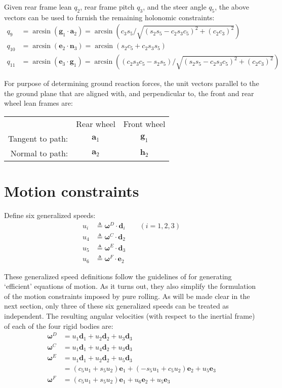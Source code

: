 \documentclass[letterpaper,11pt]{article}
\newcommand{\bs}[1]{ \boldsymbol{ #1 } }
\begin{document}
Given rear frame lean $q_2$, rear frame pitch $q_3$, and the steer angle
$q_5$, the above vectors can be used to furnish the remaining holonomic
constraints:
\begin{align*}
  q_9 & = \arcsin(\bs{g}_1 \cdot \bs{a}_2) = \arcsin\left(c_3 s_5 / \sqrt{(s_2 s_5 -
  c_2 s_3 c_5)^2 + (c_2 c_3)^2}\right) \\
  q_{10} & = \arcsin(\bs{e}_2 \cdot \bs{n}_3) = \arcsin\left(s_2 c_5 + c_2 s_3
  s_5\right)
  \\
  q_{11} & = \arcsin(\bs{e}_3 \cdot \bs{g}_1) = \arcsin \left( (c_2 s_3 c_5 - s_2
    s_5) /\sqrt{(s_2 s_5 - c_2 s_3 c_5)^2 + (c_2 c_3)^2}\right)
\end{align*}

For purpose of determining ground reaction forces, the unit vectors parallel to
the the ground plane that are aligned with, and perpendicular to, the front and
rear wheel lean frames are:
\begin{tabular}{rcc}
  & Rear wheel & Front wheel \\
  Tangent to path: & $\bs{a}_1$ & $\bs{g}_1$\\
  Normal to path: & $\bs{a}_2$ & $\bs{h}_2$
\end{tabular}

\section*{Motion constraints}
Define six generalized speeds:
\begin{align*}
  u_i & \triangleq \bs{\omega}^D \cdot \bs{d}_i \qquad (i = 1, 2, 3)\\
  u_4 & \triangleq \bs{\omega}^C \cdot \bs{d}_2\\
  u_5 & \triangleq \bs{\omega}^E \cdot \bs{d}_3\\
  u_6 & \triangleq \bs{\omega}^F \cdot \bs{e}_2
\end{align*}

These generalized speed definitions follow the guidelines of \cite{Mitiguy1996}
for generating `efficient' equations of motion.  As it turns out, they also
simplify the formulation of the motion constraints imposed by pure rolling.  As
will be made clear in the next section, only three of these six generalized
speeds can be treated as independent.  The resulting angular velocities (with
respect to the inertial frame) of each of the four rigid bodies are:
\begin{align*}
  \bs{\omega}^D & = u_1 \bs{d}_1 + u_2 \bs{d}_2 + u_3 \bs{d}_3 \\
  \bs{\omega}^C & = u_1 \bs{d}_1 + u_4 \bs{d}_2 + u_3 \bs{d}_3 \\
  \bs{\omega}^E & = u_1 \bs{d}_1 + u_2 \bs{d}_2 + u_5 \bs{d}_3 \\
                & = (c_5 u_1 + s_5 u_2)\bs{e}_1 + (-s_5 u_1 + c_5 u_2) \bs{e}_2
                    + u_5 \bs{e}_3 \\
  \bs{\omega}^F & = (c_5 u_1 + s_5 u_2)\bs{e}_1 + u_6 \bs{e}_2
                    + u_5 \bs{e}_3
\end{align*}
\end{document}
